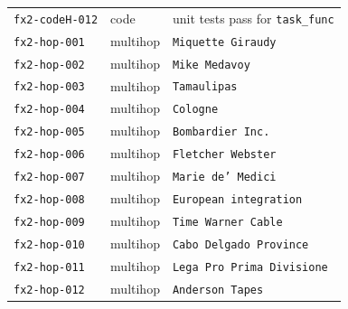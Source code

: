 \documentclass[10pt]{article}
\begin{document}
\begin{tabular}{llp{3.4in}}
\texttt{fx2-codeH-012} & code & unit tests pass for \texttt{task\_func}\\
\texttt{fx2-hop-001} & multihop & \texttt{Miquette Giraudy}\\
\texttt{fx2-hop-002} & multihop & \texttt{Mike Medavoy}\\
\texttt{fx2-hop-003} & multihop & \texttt{Tamaulipas}\\
\texttt{fx2-hop-004} & multihop & \texttt{Cologne}\\
\texttt{fx2-hop-005} & multihop & \texttt{Bombardier Inc.}\\
\texttt{fx2-hop-006} & multihop & \texttt{Fletcher Webster}\\
\texttt{fx2-hop-007} & multihop & \texttt{Marie de' Medici}\\
\texttt{fx2-hop-008} & multihop & \texttt{European integration}\\
\texttt{fx2-hop-009} & multihop & \texttt{Time Warner Cable}\\
\texttt{fx2-hop-010} & multihop & \texttt{Cabo Delgado Province}\\
\texttt{fx2-hop-011} & multihop & \texttt{Lega Pro Prima Divisione}\\
\texttt{fx2-hop-012} & multihop & \texttt{Anderson Tapes}\\
\end{tabular}
\end{document}
